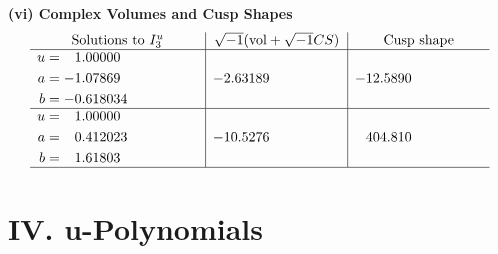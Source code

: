 \documentclass[1p]{elsarticle_modified}
\theoremstyle{definition}
\newcommand{\I}{\sqrt{-1}}
\begin{document}
\newpage\flushleft \textbf{(vi) Complex Volumes and Cusp Shapes}
$$\begin{array}{c|c|c}  
\text{Solutions to }I^u_{3}& \I (\text{vol} + \sqrt{-1}CS) & \text{Cusp shape}\\
 \hline 
\begin{aligned}
u &= \phantom{-}1.00000\phantom{ +0.000000I} \\
a &= -1.07869\phantom{ +0.000000I} \\
b &= -0.618034\phantom{ +0.000000I}\end{aligned}
 & -2.63189\phantom{ +0.000000I} & -12.5890\phantom{ +0.000000I} \\ \hline\begin{aligned}
u &= \phantom{-}1.00000\phantom{ +0.000000I} \\
a &= \phantom{-}0.412023\phantom{ +0.000000I} \\
b &= \phantom{-}1.61803\phantom{ +0.000000I}\end{aligned}
 & -10.5276\phantom{ +0.000000I} & \phantom{-}404.810\phantom{ +0.000000I}\\
 \hline 
 \end{array}$$\newpage
\newpage\renewcommand{\arraystretch}{1}
\centering \section*{ IV. u-Polynomials}
\end{document}
